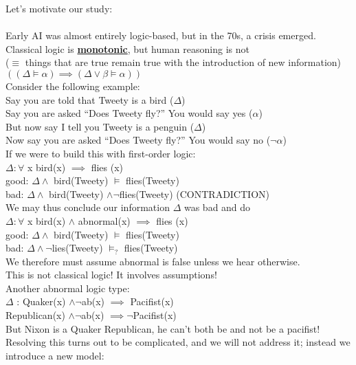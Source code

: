 \documentclass[../../lecture_notes.tex]{subfiles}
\begin{document}
\noindent Let’s motivate our study:\\
\\
Early AI was almost entirely logic-based, but in the 70s, a crisis emerged.\\
Classical logic is \textbf{\underline{monotonic}}, but human reasoning is not\\
\indent ($\equiv$ things that are true remain true with the introduction of new information)\\
\indent $((\Delta \models \alpha) \implies (\Delta \lor \beta \models \alpha))$\\

\noindent Consider the following example:\\
\indent Say you are told that Tweety is a bird ($\Delta$)\\
\indent Say you are asked “Does Tweety fly?” You would say yes ($\alpha$)\\
\indent But now say I tell you Tweety is a penguin  ($\Delta$)\\
\indent Now say you are asked “Does Tweety fly?” You would say no ($\neg\alpha$)\\
If we were to build this with first-order logic:\\
	\indent $\Delta: \forall$ x bird(x) $\implies$ flies (x)\\
	\indent \indent good: $\Delta \land$ bird(Tweety) $\models$ flies(Tweety)\\
	\indent \indent bad:  $\Delta \land$ bird(Tweety) $\land \neg$flies(Tweety) (CONTRADICTION)\\
We may thus conclude our information $\Delta$ was bad and do\\
	\indent $\Delta: \forall$ x bird(x) $\land$ abnormal(x) $\implies$ flies (x)\\
	\indent \indent good: $\Delta \land$ bird(Tweety) $\models$ flies(Tweety)\\
	\indent \indent bad:  $\Delta \land \neg$lies(Tweety) $\models_?$ flies(Tweety)\\
We therefore must assume abnormal is false unless we hear otherwise.\\
This is not classical logic! It involves assumptions!\\
Another abnormal logic type:\\
\indent $\Delta$ : Quaker(x) $\land \neg $ab(x) $\implies$ Pacifist(x)\\
\indent \indent Republican(x) $\land \neg$ab(x) $\implies \neg$Pacifist(x)\\
But Nixon is a Quaker Republican, he can’t both be and not be a pacifist!\\
Resolving this turns out to be complicated, and we will not address it; instead we introduce a new model:
\end{document}
